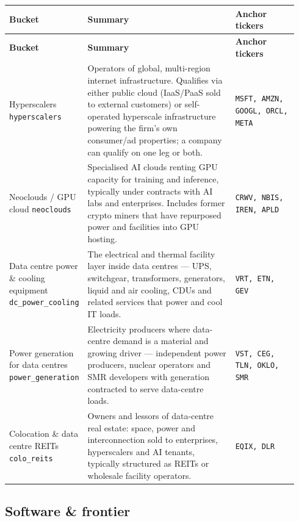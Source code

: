 \documentclass[11pt,a4paper,oneside]{article}
\begin{document}
\begin{longtable}{@{}p{0.20\linewidth} p{0.52\linewidth} p{0.22\linewidth}@{}}
\toprule
\textbf{Bucket} & \textbf{Summary} & \textbf{Anchor tickers} \\
\midrule
\endfirsthead
\toprule
\textbf{Bucket} & \textbf{Summary} & \textbf{Anchor tickers} \\
\midrule
\endhead
\bottomrule
\endfoot
Hyperscalers \newline \texttt{hyperscalers} & Operators of global, multi-region internet infrastructure. Qualifies via either public cloud (IaaS/PaaS sold to external customers) or self-operated hyperscale infrastructure powering the firm's own consumer/ad properties; a company can qualify on one leg or both. & \texttt{MSFT, AMZN, GOOGL, ORCL, META} \\
\addlinespace
Neoclouds / GPU cloud \newline \texttt{neoclouds} & Specialised AI clouds renting GPU capacity for training and inference, typically under contracts with AI labs and enterprises. Includes former crypto miners that have repurposed power and facilities into GPU hosting. & \texttt{CRWV, NBIS, IREN, APLD} \\
\addlinespace
Data centre power \& cooling equipment \newline \texttt{dc\_power\_cooling} & The electrical and thermal facility layer inside data centres --- UPS, switchgear, transformers, generators, liquid and air cooling, CDUs and related services that power and cool IT loads. & \texttt{VRT, ETN, GEV} \\
\addlinespace
Power generation for data centres \newline \texttt{power\_generation} & Electricity producers where data-centre demand is a material and growing driver --- independent power producers, nuclear operators and SMR developers with generation contracted to serve data-centre loads. & \texttt{VST, CEG, TLN, OKLO, SMR} \\
\addlinespace
Colocation \& data centre REITs \newline \texttt{colo\_reits} & Owners and lessors of data-centre real estate: space, power and interconnection sold to enterprises, hyperscalers and AI tenants, typically structured as REITs or wholesale facility operators. & \texttt{EQIX, DLR} \\
\end{longtable}

\subsection*{Software \& frontier}
\end{document}
